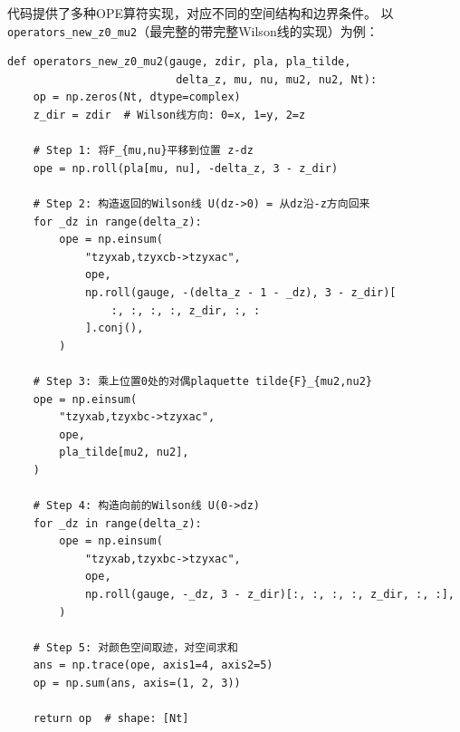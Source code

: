 \documentclass[12pt,a4paper]{ctexart}
\begin{document}
代码提供了多种OPE算符实现，对应不同的空间结构和边界条件。
以\texttt{operators\_new\_z0\_mu2}（最完整的带完整Wilson线的实现）为例：

\begin{codebox}
\begin{lstlisting}[style=pythonstyle]
def operators_new_z0_mu2(gauge, zdir, pla, pla_tilde,
                          delta_z, mu, nu, mu2, nu2, Nt):
    op = np.zeros(Nt, dtype=complex)
    z_dir = zdir  # Wilson线方向: 0=x, 1=y, 2=z

    # Step 1: 将F_{mu,nu}平移到位置 z-dz
    ope = np.roll(pla[mu, nu], -delta_z, 3 - z_dir)

    # Step 2: 构造返回的Wilson线 U(dz->0) = 从dz沿-z方向回来
    for _dz in range(delta_z):
        ope = np.einsum(
            "tzyxab,tzyxcb->tzyxac",
            ope,
            np.roll(gauge, -(delta_z - 1 - _dz), 3 - z_dir)[
                :, :, :, :, z_dir, :, :
            ].conj(),
        )

    # Step 3: 乘上位置0处的对偶plaquette tilde{F}_{mu2,nu2}
    ope = np.einsum(
        "tzyxab,tzyxbc->tzyxac",
        ope,
        pla_tilde[mu2, nu2],
    )

    # Step 4: 构造向前的Wilson线 U(0->dz)
    for _dz in range(delta_z):
        ope = np.einsum(
            "tzyxab,tzyxbc->tzyxac",
            ope,
            np.roll(gauge, -_dz, 3 - z_dir)[:, :, :, :, z_dir, :, :],
        )

    # Step 5: 对颜色空间取迹，对空间求和
    ans = np.trace(ope, axis1=4, axis2=5)
    op = np.sum(ans, axis=(1, 2, 3))

    return op  # shape: [Nt]
\end{lstlisting}
\end{codebox}
\end{document}

